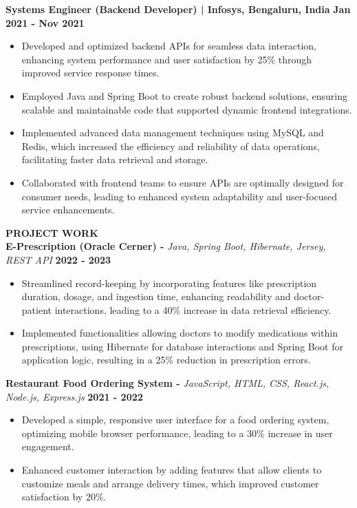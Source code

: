 \documentclass{article}
\begin{document}
\noindent \textbf{Systems Engineer (Backend Developer) | Infosys, Bengaluru, India} \hfill \textbf{Jan 2021 - Nov 2021}
\begin{itemize}[noitemsep,nolistsep,leftmargin=*]
\item {\small Developed and optimized backend APIs for seamless data interaction, enhancing system performance and user satisfaction by 25\% through improved service response times.}
\item {\small Employed Java and Spring Boot to create robust backend solutions, ensuring scalable and maintainable code that supported dynamic frontend integrations.}
\item {\small Implemented advanced data management techniques using MySQL and Redis, which increased the efficiency and reliability of data operations, facilitating faster data retrieval and storage.}
\item {\small Collaborated with frontend teams to ensure APIs are optimally designed for consumer needs, leading to enhanced system adaptability and user-focused service enhancements.}\\
\end{itemize}




\noindent \textbf{PROJECT WORK} \\
\noindent \textbf{E-Prescription (Oracle Cerner) -} \textit{Java, Spring Boot, Hibernate, Jersey, REST API} \hfill \textbf{2022 - 2023}
\begin{itemize}[noitemsep,nolistsep,leftmargin=*]
\item {\small Streamlined record-keeping by incorporating features like prescription duration, dosage, and ingestion time, enhancing readability and doctor-patient interactions, leading to a 40\% increase in data retrieval efficiency.}
\item {\small Implemented functionalities allowing doctors to modify medications within prescriptions, using Hibernate for database interactions and Spring Boot for application logic, resulting in a 25\% reduction in prescription errors.}
\end{itemize}

\noindent \textbf{Restaurant Food Ordering System -} \textit{JavaScript, HTML, CSS, React.js, Node.js, Express.js} \hfill \textbf{2021 - 2022}
\begin{itemize}[noitemsep,nolistsep,leftmargin=*]
\item {\small Developed a simple, responsive user interface for a food ordering system, optimizing mobile browser performance, leading to a 30\% increase in user engagement.}
\item {\small Enhanced customer interaction by adding features that allow clients to customize meals and arrange delivery times, which improved customer satisfaction by 20\%.}
\end{itemize}
\end{document}

